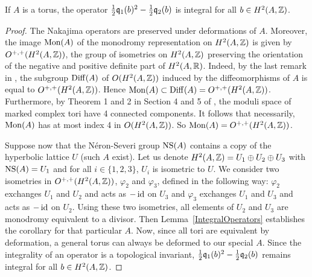 \begin{corollary} \label{IntegralOperatorsTorus}
If $A$ is a torus, the operator $\frac{1}{2}\mathfrak{q}_1(b)^2 - \frac{1}{2}\mathfrak{q}_2(b)$ is integral for all $b\in H^2(A,\mathbb{Z})$. 
\end{corollary}
\begin{proof}
The Nakajima operators are preserved under deformations of $A$. 
Moreover, 
the image $\operatorname{Mon}(A)$ of the monodromy representation on $H^2(A,\mathbb{Z})$ is given by $O^{+,+}(H^2(A,\mathbb{Z}))$, the group of isometries on $H^2(A,\mathbb{Z})$ preserving the orientation of the negative and positive definite part of $H^2(A,\mathbb{R})$.
Indeed, by the last remark in \cite{Borcea}, the subgroup $\operatorname{Diff}(A)$ of $O(H^2(A,\mathbb{Z}))$ induced by the diffeomorphisms of $A$ is equal to  $O^{+,+}(H^2(A,\mathbb{Z}))$. 
Hence $\operatorname{Mon}(A)\subset \operatorname{Diff}(A) = O^{+,+}(H^2(A,\mathbb{Z}))$. Furthermore, by Theorem 1 and 2 in Section 4 and 5 of \cite{Shioda}, the moduli space of marked complex tori have 4 connected components. 
It follows that necessarily, $\operatorname{Mon}(A)$ has at most index 4 in $O(H^2(A,\mathbb{Z}))$. So $\operatorname{Mon}(A)= O^{+,+}(H^2(A,\mathbb{Z}))$.



Suppose now that the N\'eron-Severi group $\operatorname{NS}(A)$ contains a copy of the hyperbolic lattice $U$ (such $A$ exist).
Let us denote $H^2(A,\mathbb{Z})=U_1\oplus U_2\oplus U_3$ with $\operatorname{NS}(A)=U_1$ and for all $i\in\{1,2,3\}$, $U_i$ is isometric to $U$.
We consider two isometries in $O^{+,+}(H^2(A,\mathbb{Z}))$, $\varphi_2$ and $\varphi_3$, defined in the following way:
$\varphi_2$ exchanges $U_1$ and $U_2$ and acts as $-\operatorname{id}$ on $U_3$ and $\varphi_3$ exchanges $U_1$ and $U_3$ and acts as $-\operatorname{id}$ on $U_2$.
Using these two isometries, all elements of $U_2$ and $U_3$ are monodromy equivalent to a divisor.
Then Lemma~\ref{IntegralOperators} establishes the corollary for that particular $A$. 
Now, since all tori are equivalent by deformation, a general torus can always be deformed to our special $A$. Since the integrality of an operator is a topological invariant, $\frac{1}{2}\mathfrak{q}_1(b)^2 - \frac{1}{2}\mathfrak{q}_2(b)$ remains integral for all $b\in H^2(A,\mathbb{Z})$.
\end{proof}

